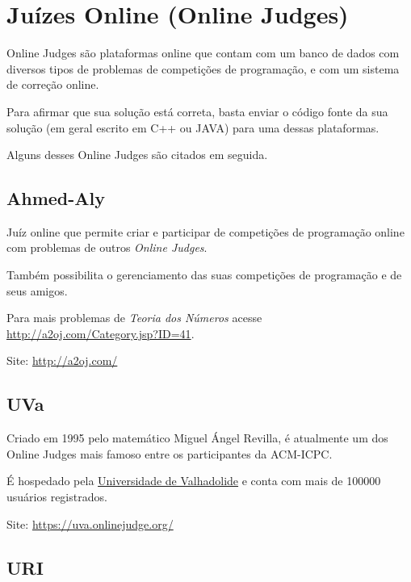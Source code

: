 
\chapter{Juízes Online (Online Judges)} %

\label{AppendixB} %

Online Judges são plataformas online que contam com um banco de dados com diversos tipos de problemas de competições de programação, e com um sistema de correção online.

Para afirmar que sua solução está correta, basta enviar o código fonte da sua solução (em geral escrito em C++ ou JAVA) para uma dessas plataformas.

Alguns desses Online Judges são citados em seguida.


\section{Ahmed-Aly}

Juíz online que permite criar e participar de competições de programação online com problemas de outros \textit{Online Judges}.

Também possibilita o gerenciamento das suas competições de programação e de seus amigos.

Para mais problemas de \textit{Teoria dos Números} acesse \href{http://a2oj.com/Category.jsp?ID=41}{http://a2oj.com/Category.jsp?ID=41}.

Site: \href{http://a2oj.com/}{http://a2oj.com/}


\section{UVa} 
	
Criado em 1995 pelo matemático Miguel Ángel Revilla, é atualmente um dos Online Judges mais famoso entre os participantes da ACM-ICPC.

É hospedado pela \href{http://www.uva.es/export/sites/uva/}{Universidade de Valhadolide} e conta com mais de 100000 usuários registrados.

Site: \href{https://uva.onlinejudge.org/}{https://uva.onlinejudge.org/}


\section{URI}


